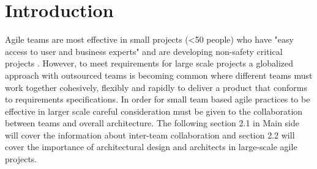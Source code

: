 \documentclass[sigplan,screen]{acmart}
\begin{document}
%
\maketitle

\section{Introduction}
Agile teams are most effective in small projects (<50 people) who have "easy access to user and business experts" and are developing non-safety critical projects \cite{Dingsøyr14}. However, to meet requirements for large scale projects a globalized approach with outsourced teams is becoming common \cite{Jeff} where different teams must work together cohesively, flexibly and rapidly to deliver  a product that conforms to requirements specifications. In order for small team based agile practices to be effective in larger scale careful consideration must be given to the collaboration between teams and overall architecture. The following section 2.1 in Main side will cover the information about inter-team collaboration and section 2.2 will cover the importance of architectural design and architects in large-scale agile projects. 
 
 
\end{document}
